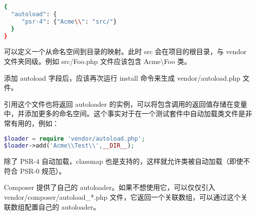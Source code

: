 \begin{lstlisting}[language=bash]
{
  "autoload": {
     "psr-4": {"Acme\\": "src/"}
  }
}
\end{lstlisting}


可以定义一个从命名空间到目录的映射。此时 src 会在项目的根目录，与 vendor 文件夹同级。例如 src/Foo.php 文件应该包含 Acme\textbackslash Foo 类。


添加 autoload 字段后，应该再次运行 install 命令来生成 vendor/autoload.php 文件。

引用这个文件也将返回 autoloader 的实例，可以将包含调用的返回值存储在变量中，并添加更多的命名空间。这个事实对于在一个测试套件中自动加载类文件是非常有用的，例如：

\begin{lstlisting}[language=PHP]
$loader = require 'vendor/autoload.php';
$loader->add('Acme\\Test\\',__DIR__);
\end{lstlisting}


除了 PSR-4 自动加载，classmap 也是支持的，这样就允许类被自动加载（即使不符合 PSR-0 规范）。

Composer 提供了自己的 autoloader。如果不想使用它，可以仅仅引入 vendor/composer/autoload\_*.php 文件，它返回一个关联数组，可以通过这个关联数组配置自己的 autoloader。




